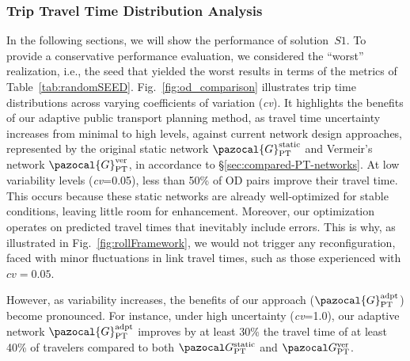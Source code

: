 \documentclass[a4paper,fleqn]{cas-sc}
\begin{document}
\subsubsection{Trip Travel Time Distribution Analysis}

In the following sections, we will show the performance of solution~$S1$. To provide a conservative performance evaluation, we considered the ``worst'' realization, i.e., the seed that yielded the worst results in terms of the metrics of Table~\ref{tab:randomSEED}.
Fig.~\ref{fig:od_comparison} illustrates trip time distributions across varying coefficients of variation (\textit{cv}). It highlights the benefits of our adaptive public transport planning method, as travel time uncertainty increases from minimal to high levels, against current network design approaches, represented by the original static network $\pazocal{G}_{\text{PT}}^{\text{static}}$ and Vermeir's network $\pazocal{G}_{\text{PT}}^{\text{ver}}$, in accordance to \S{}\ref{sec:compared-PT-networks}.
%
At low variability levels (\textit{cv}=0.05), less than 50\% of OD pairs improve their travel time. This occurs because these static networks are already well-optimized for stable conditions, leaving little room for enhancement. 
%
Moreover, our optimization operates on predicted travel times that inevitably include errors. This is why, as illustrated in Fig.~\ref{fig:rollFramework}, we would not trigger any reconfiguration, faced with minor fluctuations in link travel times, such as those experienced with $\textit{cv}=0.05$.

However, as variability increases, the benefits of our approach ($\pazocal{G}_{\text{PT}}^{\text{adpt}}$) become pronounced. For instance, under high uncertainty (\textit{cv}=1.0), our adaptive network $\pazocal{G}_{\text{PT}}^{\text{adpt}}$ improves by at least 30\% the travel time of at least 40\% of travelers compared to both $\pazocal G_\text{PT}^\text{static}$ and $\pazocal G_\text{PT}^\text{ver}$. 
\end{document}
